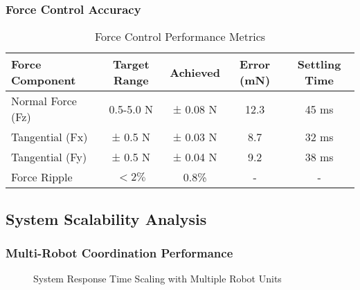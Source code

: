 \subsubsection{Force Control Accuracy}

\begin{table}[htbp]
\centering
\caption{Force Control Performance Metrics}
\label{tab:app-force-accuracy}
\begin{tabular}{|l|c|c|c|c|}
\hline
\textbf{Force Component} & \textbf{Target Range} & \textbf{Achieved} & \textbf{Error (mN)} & \textbf{Settling Time} \\
\hline
Normal Force (Fz) & 0.5-5.0 N & ± 0.08 N & 12.3 & 45 ms \\
Tangential (Fx) & ± 0.5 N & ± 0.03 N & 8.7 & 32 ms \\
Tangential (Fy) & ± 0.5 N & ± 0.04 N & 9.2 & 38 ms \\
Force Ripple & $< 2\%$ & 0.8\% & - & - \\
\hline
\end{tabular}
\end{table}

\subsection{System Scalability Analysis}

\subsubsection{Multi-Robot Coordination Performance}

\begin{figure}[htbp]
\centering
{}
\caption{System Response Time Scaling with Multiple Robot Units}
\label{fig:app-scalability}
\end{figure}

